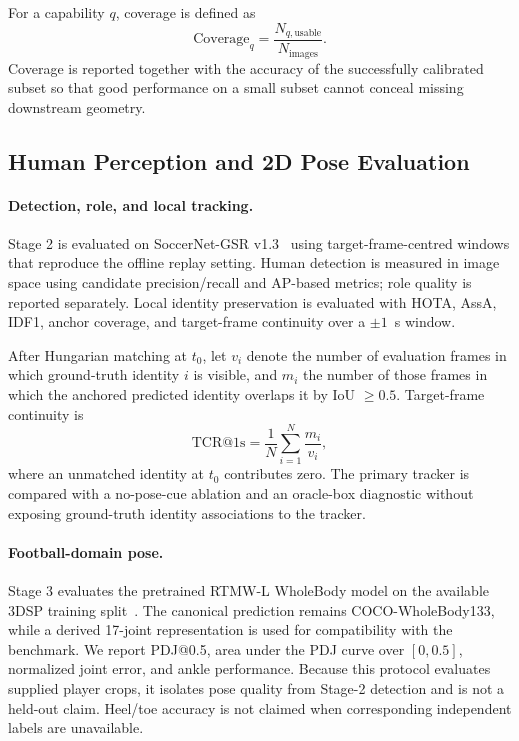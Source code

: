\documentclass[runningheads]{llncs}
\begin{document}
For a capability $q$, coverage is defined as
\begin{equation}
\mathrm{Coverage}_q=\frac{N_{q,\mathrm{usable}}}{N_{\mathrm{images}}}.
\end{equation}
Coverage is reported together with the accuracy of the successfully calibrated subset so that good performance on a small subset cannot conceal missing downstream geometry.

\subsection{Human Perception and 2D Pose Evaluation}
\label{subsec:human_eval}
\paragraph{Detection, role, and local tracking.}
Stage 2 is evaluated on SoccerNet-GSR v1.3~\cite{gsr} using target-frame-centred windows that reproduce the offline replay setting. Human detection is measured in image space using candidate precision/recall and AP-based metrics; role quality is reported separately. Local identity preservation is evaluated with HOTA, AssA, IDF1, anchor coverage, and target-frame continuity over a $\pm1$~s window.

After Hungarian matching at $t_0$, let $v_i$ denote the number of evaluation frames in which ground-truth identity $i$ is visible, and $m_i$ the number of those frames in which the anchored predicted identity overlaps it by IoU $\geq0.5$. Target-frame continuity is
\begin{equation}
\mathrm{TCR}@1\mathrm{s}=\frac{1}{N}\sum_{i=1}^{N}\frac{m_i}{v_i},
\end{equation}
where an unmatched identity at $t_0$ contributes zero. The primary tracker is compared with a no-pose-cue ablation and an oracle-box diagnostic without exposing ground-truth identity associations to the tracker.

\paragraph{Football-domain pose.}
Stage 3 evaluates the pretrained RTMW-L WholeBody model on the available 3DSP training split~\cite{autosoccerpose}. The canonical prediction remains COCO-WholeBody133, while a derived 17-joint representation is used for compatibility with the benchmark. We report PDJ@0.5, area under the PDJ curve over $[0,0.5]$, normalized joint error, and ankle performance. Because this protocol evaluates supplied player crops, it isolates pose quality from Stage-2 detection and is not a held-out claim. Heel/toe accuracy is not claimed when corresponding independent labels are unavailable.
\end{document}
